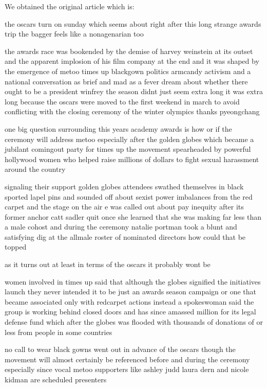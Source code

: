 We obtained the original article which is:\\
\bfseries{
the oscars turn  on sunday which seems about right after this long strange
awards trip the bagger feels like a nonagenarian too

the awards race was bookended by the demise of harvey weinstein at its outset
and the apparent implosion of his film company at the end and it was shaped by
the emergence of metoo times up blackgown politics armcandy activism and
a national conversation as brief and mad as a fever dream about whether there
ought to be a president winfrey the season didnt just seem extra long it was
extra long because the oscars were moved to the first weekend in march to
avoid conflicting with the closing ceremony of the winter olympics thanks
pyeongchang

one big question surrounding this years academy awards is how or if the
ceremony will address metoo especially after the golden globes which became
a jubilant comingout party for times up the movement spearheaded by 
powerful hollywood women who helped raise millions of dollars to fight sexual
harassment around the country

signaling their support golden globes attendees swathed themselves in black
sported lapel pins and sounded off about sexist power imbalances from the red
carpet and the stage on the air e was called out about pay inequity after
its former anchor catt sadler quit once she learned that she was making far
less than a male cohost and during the ceremony natalie portman took a blunt
and satisfying dig at the allmale roster of nominated directors how could
that be topped

as it turns out at least in terms of the oscars it probably wont be

women involved in times up said that although the globes signified the
initiatives launch they never intended it to be just an awards season
campaign or one that became associated only with redcarpet actions instead
a spokeswoman said the group is working behind closed doors and has since
amassed  million for its legal defense fund which after the globes was
flooded with thousands of donations of  or less from people in some 
countries


no call to wear black gowns went out in advance of the oscars though the
movement will almost certainly be referenced before and during the ceremony 
especially since vocal metoo supporters like ashley judd laura dern and
nicole kidman are scheduled presenters

}
